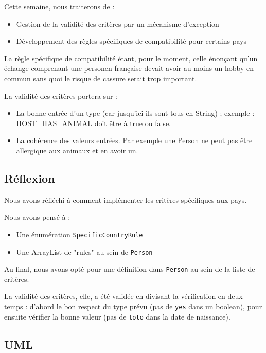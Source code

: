 \documentclass{mytex}
\begin{document}
Cette semaine, nous traiterons de : 

\begin{itemize}
	\item Gestion de la validité des critères par un mécanisme d’exception
	\item Développement des règles spécifiques de compatibilité pour certains pays
\end{itemize}

La règle spécifique de compatibilité étant, pour le moment, celle énonçant qu'un échange comprenant une personen française devait avoir au moins un hobby en commun sans quoi le risque de cassure serait trop important.

La validité des critères portera sur :

\begin{itemize}
	\item La bonne entrée d'un type (car jusqu'ici ils sont tous en String) ; exemple : HOST\_HAS\_ANIMAL doit être à true ou false.
	\item La cohérence des valeurs entrées. Par exemple une Person ne peut pas être allergique aux animaux et en avoir un.
\end{itemize}

\subsection{Réflexion}

Nous avons réfléchi à comment implémenter les critères spécifiques aux pays.

Nous avons pensé à :

\begin{itemize}
	\item Une énumération \texttt{SpecificCountryRule}
	\item Une ArrayList de "rules" au sein de \texttt{Person}
\end{itemize}

Au final, nous avons opté pour une définition dans \texttt{Person} au sein de la liste de critères.

La validité des critères, elle, a été validée en divisant la vérification en deux temps : d'abord le bon respect du type prévu (pas de \texttt{yes} dans un boolean), pour ensuite vérifier la bonne valeur (pas de \texttt{toto} dans la date de naissance).

\subsection{UML}
\end{document}
